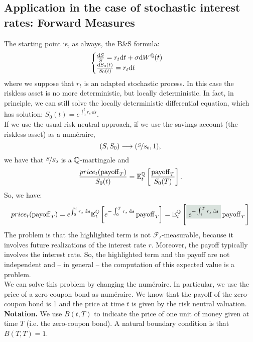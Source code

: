 \subsection[Forward Measures]{Application in the case of stochastic interest rates: Forward Measures} %
The starting point is, as always, the B\&S formula:
\begin{equation}
    \begin{cases}
    \frac{\dd S}{S} = r_t\dd t + \sigma\dd W^{\mathbb{Q}}(t) \\
    \frac{\dd S_0(t)}{S_0(t)} = r_t\dd t
    \end{cases} 
\end{equation}
where we suppose that $r_t$ is an adapted stochastic process. In this case the riskless asset is no more deterministic, but locally deterministic. In fact, in principle, we can still solve the locally deterministic differential equation, which has solution: $S_0(t) = e^{\int_0^t r_s\,\dd s}$.\\
If we use the usual risk neutral approach, if we use the savings account (the riskless asset) as a numéraire, 
\begin{equation}
    (S,S_0)\longrightarrow(\nicefrac{S}{S_0},1),
\end{equation}
we have that $\nicefrac{S}{S_0}$ is a $\mathbb{Q}$-martingale and 
\begin{equation}
    \frac{price_t(\operatorname{payoff}_T)}{S_0(t)} = \mathbb{E}_t^{\mathbb{Q}} \left[\frac{\operatorname{payoff}_T}{S_0(T)}\right].
\end{equation}
So, we have:
\begin{equation}
    price_t(\pay_T) = e^{\int_0^t r_s\,\dd s}\mathbb{E}_t^{\Qmeas} \left[e^{-\int_0^T r_s\,\dd s}\pay_T\right] = \mathbb{E}_t^{\Qmeas} \left[\hlc{mytweed}{e^{-\int_t^T r_s\,\dd s}}\pay_T\right]
\end{equation}
The problem is that the highlighted term is not $\mathcal{F}_t$-measurable, because it involves future realizations of the interest rate $r$. Moreover, the payoff typically involves the interest rate. So, the highlighted term and the payoff are not independent and -- in general -- the computation of this expected value is a problem.\\
We can solve this problem by changing the numéraire. In particular, we use the price of a zero-coupon bond as numéraire. We know that the payoff of the zero-coupon bond is 1 and the price at time $t$ is given by the risk neutral valuation.
\medbreak
\noindent\textbf{Notation.} We use $B(t,T)$ to indicate the price of one unit of money given at time $T$ (i.e. the zero-coupon bond). A natural boundary condition is that $B(T,T)=1$.
